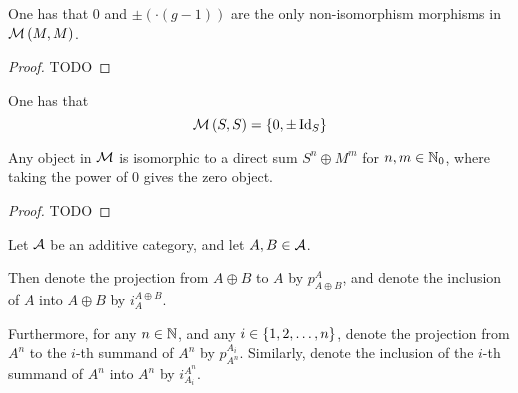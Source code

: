 \begin{lemma} \label{lem:only_non_surjective_M_to_M}
    One has that \( 0 \) and \( \pm(\cdot(g - 1)) \) are the only non-isomorphism morphisms in \( {\mathcal{M}}\left( M, M \right) \).
\end{lemma}
\begin{proof}
    TODO
\end{proof}

\begin{lemma} \label{lem:S-to-S}
    One has that
    \[
        {\mathcal{M}}\left( S, S \right) = \left\{ 0, \pm \operatorname{Id}_S \right\}
    \]
\end{lemma}

\begin{lemma} \label{thm:f_3c_3_decomposition}
    Any object in \( {\mathcal{M}} \) is isomorphic to a direct sum \( S^n \oplus M^m \) for \( n, m \in {\mathbb{N}}_0 \), where taking the power of \( 0 \) gives the zero object.
\end{lemma}
\begin{proof}
    TODO
\end{proof}

\begin{notation}
    Let \( {\mathcal{A}} \) be an additive category, and let \( A, B \in {\mathcal{A}} \).

    Then denote the projection from \( A \oplus B \) to \( A \) by \( p_{A \oplus B}^A \), and denote the inclusion of \( A \) into \( A \oplus B \) by \( i_A^{A \oplus B} \).

    Furthermore, for any \( n \in {\mathbb{N}} \), and any \( i \in \left\{ 1, 2, \dots, n \right\} \), denote the projection from \( A^n \) to the \( i \)-th summand of \( A^n \) by \( p_{A^n}^{A_i} \). Similarly, denote the inclusion of the \( i \)-th summand of \( A^n \) into \( A^n \) by \( i_{A_i}^{A^n} \).
\end{notation}

